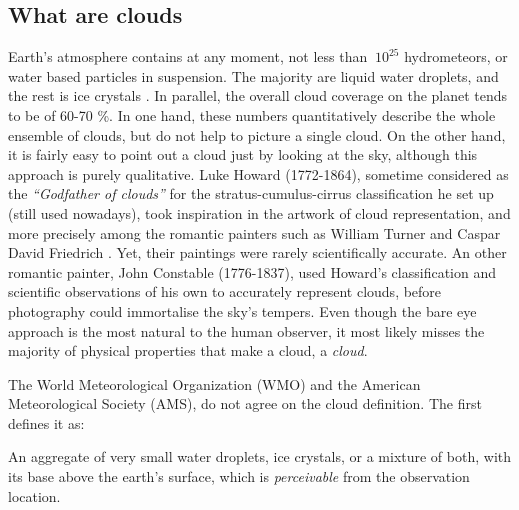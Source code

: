     \subsection{What are clouds}
    \label{sec:what_is_a_cloud}

    Earth's atmosphere contains at any moment, not less than $~10^{25}$ hydrometeors, or water based particles in suspension. The majority are liquid water droplets, and the rest is ice crystals \citep{cantrell_production_2005}.
    In parallel, the overall cloud coverage on the planet tends to be of 60-70 \%.
    In one hand, these numbers quantitatively describe the whole ensemble of clouds, but do not help to picture a single cloud.
    On the other hand, it is fairly easy to point out a cloud just by looking at the sky, although this approach is purely qualitative.
    Luke Howard (1772-1864), sometime considered as the \textit{``Godfather of clouds''} for the stratus-cumulus-cirrus classification he set up (still used nowadays), took inspiration in the artwork of cloud representation, and more precisely among the romantic painters such as William Turner and Caspar David Friedrich \citep{howard_lxiv_1803}. Yet, their paintings were rarely scientifically accurate. 
    An other romantic painter, John Constable (1776-1837), used Howard's classification and scientific observations of his own to accurately represent clouds, before photography could immortalise the sky's tempers.
    Even though the bare eye approach is the most natural to the human observer, it most likely misses the majority of physical properties that make a cloud, a \textit{cloud}.

    The World Meteorological Organization (WMO) and the American Meteorological Society (AMS), do not agree on the cloud definition.
    The first defines it as:
    \begin{displayquote}
        An aggregate of very small water droplets, ice crystals, or a mixture of both, with its base above the earth’s surface, which is \textit{perceivable} from the observation location.
    \end{displayquote}

